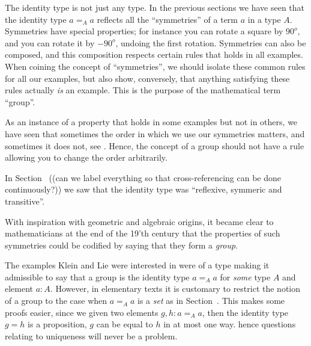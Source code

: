 The identity type is not just any type.  In the previous sections we have seen that the identity type $a=_Aa$ reflects all the ``symmetries'' of a term $a$ in a type $A$.  Symmetries have special properties; for instance you can rotate a square by $90^o$, and you can rotate it by $-90^o$, undoing the first rotation.  
Symmetries can also be composed, and this composition respects certain rules that holds in all examples.  When coining the concept of ``symmetries'', we should isolate these common rules for all our examples, but also show, conversely, that anything satisfying these rules actually {\em is} an example.  This is the purpose of the mathematical term ``group''. 

As an instance of a property that holds in some examples but not in others, we have seen that sometimes the order in which we use our symmetries matters, and sometimes it does not, see .  Hence, the concept of a group should not have a rule allowing you to change the order arbitrarily.

In Section~ ((can we label everything so that cross-referencing can be done continuously?)) we saw that the identity type was ``reflexive, symmeric and transitive''.  

With inspiration with geometric and algebraic origins, it became clear to mathematicians at the end of the 19'th century that the properties of such symmetries could be codified by saying that they form a {\em group}. 

The examples Klein and Lie were interested in were of a type making it admissible to say that a group is the identity type $a=_Aa$ for {\em some} type $A$ and element $a:A$.  
However, in elementary texts it is customary to restrict the notion of a group to the case when $a=_Aa$ is a {\em set} as in Section~.  This makes some proofs easier, since we given two elements $g,h:a=_Aa$, then the identity type $g=h$ is a proposition, \ie $g$ can be equal to $h$ in at most one way.  hence questions relating to uniqueness will never be a problem.


